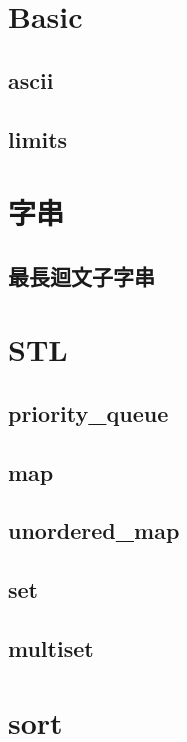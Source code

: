 \section{Basic}
    \subsection{ascii}
        
    \subsection{limits}
        

\section{字串}
    \subsection{最長迴文子字串}
        

\section{STL}
    \subsection{priority\_queue}
        
    \subsection{map}
        
    \subsection{unordered\_map}
        
    \subsection{set}
        
    \subsection{multiset}
        

\section{sort}
